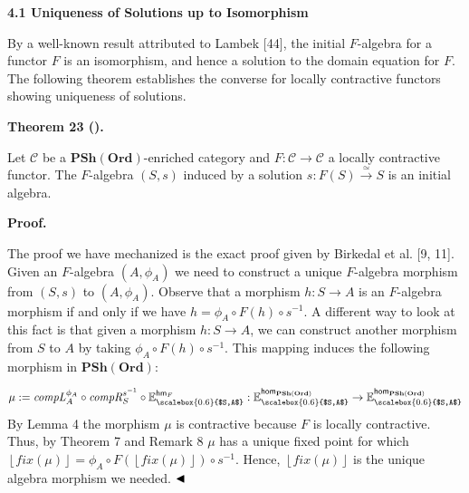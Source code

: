 \documentclass[10pt,a4paper]{article}
\begin{document}
 
 
\par\medskip\noindent\textbf{4.1 Uniqueness of Solutions up to Isomorphism}\par
 
 
By a well-known result attributed to Lambek [44], the initial $F$-algebra for a functor $F$ is an isomorphism, and hence a solution to the domain equation for $F$. The following theorem establishes the converse for locally contractive functors showing uniqueness of solutions.\par
 
 
 
\par\medskip\noindent\textbf{Theorem 23 ().}\par
 
 
Let $\mathcal{C}$ be a $\mathbf{PSh}(\mathbf{Ord})$-enriched category and $F:\mathcal{C}\to\mathcal{C}$ a locally contractive functor. The $F$-algebra $(S,s)$ induced by a solution $s:F(S)\xrightarrow{\simeq}S$ is an initial algebra.\par
 
 
 
 
\par\medskip\noindent\textbf{Proof.}\par
 
 
The proof we have mechanized is the exact proof given by Birkedal et al. [9, 11]. Given an $F$-algebra $(A,\phi_{A})$ we need to construct a unique $F$-algebra morphism from $(S,s)$ to $(A,\phi_{A})$. Observe that a morphism $h:S\to A$ is an $F$-algebra morphism if and only if we have $h=\phi_{A}\circ F(h)\circ s^{-1}$. A different way to look at this fact is that given a morphism $h:S\to A$, we can construct another morphism from $S$ to $A$ by taking $\phi_{A}\circ F(h)\circ s^{-1}$. This mapping induces the following morphism in $\mathbf{PSh}(\mathbf{Ord})$:\par
    \[\mu:=\mathit{compL}^{\phi_{A}}_{A}\circ\mathit{compR}^{s^{-1}}_{S}\circ\mathbb{E}^{\mathsf{hm}_{F}}_{\scalebox{0.6}{$S,A$}}:\mathbb{E}^{\mathsf{hom}_{\mathbf{PSh}(\mathbf{Ord})}}_{\scalebox{0.6}{$S,A$}}\to\mathbb{E}^{\mathsf{hom}_{\mathbf{PSh}(\mathbf{Ord})}}_{\scalebox{0.6}{$S,A$}}\]    
By Lemma 4 the morphism $\mu$ is contractive because $F$ is locally contractive. Thus, by Theorem 7 and Remark 8 $\mu$ has a unique fixed point for which $\left\lfloor{\mathit{fix}(\mu)}\right\rfloor=\phi_{A}\circ F(\left\lfloor{\mathit{fix}(\mu)}\right\rfloor)\circ s^{-1}$. Hence, $\left\lfloor{\mathit{fix}(\mu)}\right\rfloor$ is the unique algebra morphism we needed. $\hfill\blacktriangleleft$\par
 
\end{document}
